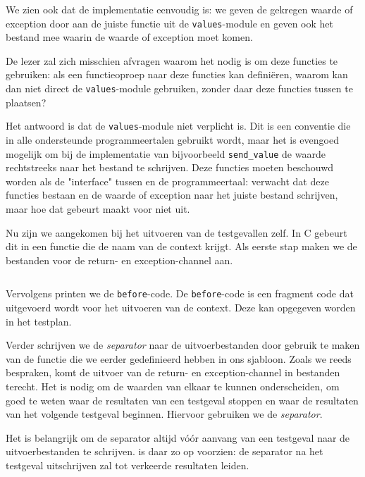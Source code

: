 \inputminted[firstline=25,lastline=27]{mako}{sources/c-context.mako}
\vspace{-1.7cm} %
\inputminted[firstline=29,lastline=30]{mako}{sources/c-context.mako}

We zien ook dat de implementatie eenvoudig is: we geven de gekregen waarde of exception door aan de juiste functie uit de \texttt{values}-module en geven ook het bestand mee waarin de waarde of exception moet komen.

De lezer zal zich misschien afvragen waarom het nodig is om deze functies te gebruiken: als \tested{} een functieoproep naar deze functies kan definiëren, waarom kan \tested{} dan niet direct de \texttt{values}-module gebruiken, zonder daar deze functies tussen te plaatsen?

Het antwoord is dat de \texttt{values}-module niet verplicht is.
Dit is een conventie die in alle ondersteunde programmeertalen gebruikt wordt, maar het is evengoed mogelijk om bij de implementatie van bijvoorbeeld \texttt{send\_value} de waarde rechtstreeks naar het bestand te schrijven.
Deze functies moeten beschouwd worden als de "interface" tussen \tested{} en de programmeertaal: \tested{} verwacht dat deze functies bestaan en de waarde of exception naar het juiste bestand schrijven, maar hoe dat gebeurt maakt voor \tested{} niet uit.

Nu zijn we aangekomen bij het uitvoeren van de testgevallen zelf.
In C gebeurt dit in een functie die de naam van de context krijgt.
Als eerste stap maken we de bestanden voor de return- en exception-channel aan.

\inputminted[firstline=33,lastline=36]{mako}{sources/c-context.mako}

Vervolgens printen we de \texttt{before}-code.
De \texttt{before}-code is een fragment code dat uitgevoerd wordt voor het uitvoeren van de context.
Deze kan opgegeven worden in het testplan.

Verder schrijven we de \emph{separator} naar de uitvoerbestanden door gebruik te maken van de functie die we eerder gedefinieerd hebben in ons sjabloon.
Zoals we reeds bespraken, komt de uitvoer van de return- en exception-channel in bestanden terecht.
Het is nodig om de waarden van elkaar te kunnen onderscheiden, om goed te weten waar de resultaten van een testgeval stoppen en waar de resultaten van het volgende testgeval beginnen.
Hiervoor gebruiken we de \emph{separator}.

Het is belangrijk om de separator altijd vóór aanvang van een testgeval naar de uitvoerbestanden te schrijven.
\tested{} is daar zo op voorzien: de separator na het testgeval uitschrijven zal tot verkeerde resultaten leiden.

